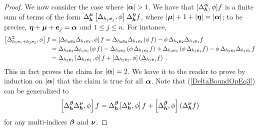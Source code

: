 \begin{proof}
  We now consider the case where $|\VEC{\alpha}|>1$.
We have that $\displaystyle [\Delta^{{\bm{\alpha}}}_{{\bm{h}}}, \phi] f$
is a finite sum of terms of the form
$\displaystyle \Delta^{{\bm{\mu}}}_{{\bm{h}}} \left[
\Delta_{h_j {\bm{e}}_j}, \phi\right] \Delta^{{\bm{\eta}}}_{{\bm{h}}}f$,
where $|{\bm{\mu}}|+1+|{\bm{\eta}}| = |{\bm{\alpha}}|$; to be precise,
${\bm{\eta}}+{\bm{\mu}} + {\bm{e}}_j = {\bm{\alpha}}$ and
$1 \leq j \leq n$.  For instance,
\begin{align}
\left[\Delta^2_{h_1{\bm{e}}_1+h_2{\bm{e}}_2} ,\phi\right] f
&=\left[\Delta_{h_2{\bm{e}}_2} \Delta_{h_1{\bm{e}}_1} ,\phi\right] f
= \Delta_{h_2{\bm{e}}_2} \Delta_{h_1{\bm{e}}_1} (\phi \, f)
- \phi\, \Delta_{h_2{\bm{e}}_2} \Delta_{h_1{\bm{e}}_1} f \nonumber \\
&= \Delta_{h_2{\bm{e}}_2} \Delta_{h_1{\bm{e}}_1} (\phi \, f)
- \Delta_{h_2{\bm{e}}_2} \left( \phi \, \Delta_{h_1{\bm{e}}_1} f\right)
+ \Delta_{h_2{\bm{e}}_2} \left( \phi \, \Delta_{h_1{\bm{e}}_1} f\right)
- \phi\, \Delta_{h_2{\bm{e}}_2} \Delta_{h_1{\bm{e}}_1} f \nonumber \\
&= \Delta_{h_2{\bm{e}}_2} \left[ \Delta_{h_1{\bm{e}}_1} ,\phi \right] f
+ \left[ \Delta_{h_2{\bm{e}}_2}, \phi\right]
\left( \Delta_{h_1{\bm{e}}_1} f\right) \ .
\label{DeltaBoundOpEq3}
\end{align}
This in fact proves the claim for $|{\bm{\alpha}}|=2$.  We leave it to the
reader to prove by induction on $|{\bm{\alpha}}|$ that the claim is true for
all ${\bm{\alpha}}$.  Note that (\ref{DeltaBoundOpEq3}) can be generalized to
\[
\left[\Delta_{{\bm{h}}}^{{\bm{\beta}}} \Delta_{{\bm{h}}}^{{\bm{\nu}}} ,\phi\right] f
= \Delta_{{\bm{h}}}^{{\bm{\beta}}} \left[ \Delta_{{\bm{h}}}^{{\bm{\nu}}}
,\phi \right] f
+ \left[ \Delta_{{\bm{h}}}^{{\bm{\beta}}}, \phi\right]
\left( \Delta_{{\bm{h}}}^{{\bm{\nu}}} f\right)
\]
for any multi-indices ${\bm{\beta}}$ and ${\bm{\nu}}$.


\end{proof}
